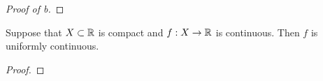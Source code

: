 \documentclass[../main.tex]{subfiles}
\begin{document}
\begin{exercise}
\begin{proof}[Proof of b]
    \end{proof}
\end{exercise}
\newpage

\begin{theorem}\label{trm:13.6}
    Suppose that $X\subset\mathbb{R}$ is compact and $f:X\to\mathbb{R}$ is continuous. Then $f$ is uniformly continuous.
    \begin{proof}

\end{proof}
\end{theorem}
\end{document}
